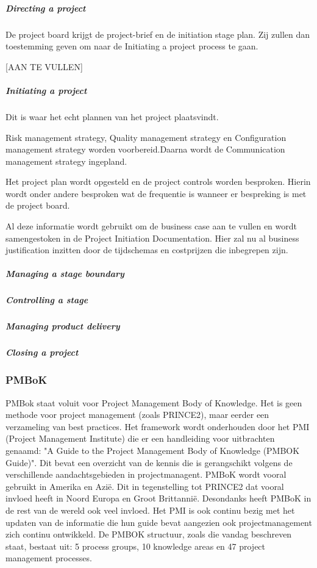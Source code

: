 \documentclass[]{article}
\begin{document}
\subparagraph{Directing a project}
De project board krijgt de project-brief en de initiation stage plan. Zij zullen dan toestemming geven om naar de Initiating a project process te gaan. 

[AAN TE VULLEN]


\subparagraph{Initiating a project}
Dit is waar het echt plannen van het project plaatsvindt.

Risk management strategy, Quality management strategy en Configuration management strategy worden voorbereid.Daarna wordt de Communication management strategy ingepland. 

Het project plan wordt opgesteld en de project controls worden besproken. Hierin wordt onder andere besproken wat de frequentie is wanneer er bespreking is met de project board.

Al deze informatie wordt gebruikt om de business case aan te vullen en wordt samengestoken in de Project Initiation Documentation. Hier zal nu al business justification inzitten door de tijdschemas en costprijzen die inbegrepen zijn.

\subparagraph{Managing a stage boundary}

\subparagraph{Controlling a stage}

\subparagraph{Managing product delivery}

\subparagraph{Closing a project}

\subsubsection{PMBoK}
PMBok staat voluit voor Project Management Body of Knowledge. Het is geen methode voor project management (zoals PRINCE2), maar eerder een verzameling van best practices. Het framework wordt onderhouden door het PMI (Project Management Institute) die er een handleiding voor uitbrachten genaamd: "A Guide to the Project Management Body of Knowledge (PMBOK\textsuperscript{\textregistered} Guide)". Dit bevat een overzicht van de kennis die is gerangschikt volgens de verschillende aandachtsgebieden in projectmanagent. PMBoK wordt vooral gebruikt in Amerika en Azië. Dit in tegenstelling tot PRINCE2 dat vooral invloed heeft in Noord Europa en Groot Brittannië. Desondanks heeft PMBoK in de rest van de wereld ook veel invloed. Het PMI is ook continu bezig met het updaten van de informatie die hun guide bevat aangezien ook projectmanagement zich continu ontwikkeld. De PMBOK\textsuperscript{\textregistered} structuur, zoals die vandag beschreven staat, bestaat uit: 5 process groups, 10 knowledge areas en 47 project management processes.	
\end{document}
